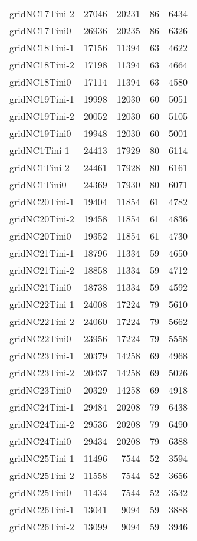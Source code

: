 \begin{tabular}{lrrrr}
gridNC17Tini-2 & 27046 & 20231 & 86 & 6434 \\
gridNC17Tini0 & 26936 & 20235 & 86 & 6326 \\
gridNC18Tini-1 & 17156 & 11394 & 63 & 4622 \\
gridNC18Tini-2 & 17198 & 11394 & 63 & 4664 \\
gridNC18Tini0 & 17114 & 11394 & 63 & 4580 \\
gridNC19Tini-1 & 19998 & 12030 & 60 & 5051 \\
gridNC19Tini-2 & 20052 & 12030 & 60 & 5105 \\
gridNC19Tini0 & 19948 & 12030 & 60 & 5001 \\
gridNC1Tini-1 & 24413 & 17929 & 80 & 6114 \\
gridNC1Tini-2 & 24461 & 17928 & 80 & 6161 \\
gridNC1Tini0 & 24369 & 17930 & 80 & 6071 \\
gridNC20Tini-1 & 19404 & 11854 & 61 & 4782 \\
gridNC20Tini-2 & 19458 & 11854 & 61 & 4836 \\
gridNC20Tini0 & 19352 & 11854 & 61 & 4730 \\
gridNC21Tini-1 & 18796 & 11334 & 59 & 4650 \\
gridNC21Tini-2 & 18858 & 11334 & 59 & 4712 \\
gridNC21Tini0 & 18738 & 11334 & 59 & 4592 \\
gridNC22Tini-1 & 24008 & 17224 & 79 & 5610 \\
gridNC22Tini-2 & 24060 & 17224 & 79 & 5662 \\
gridNC22Tini0 & 23956 & 17224 & 79 & 5558 \\
gridNC23Tini-1 & 20379 & 14258 & 69 & 4968 \\
gridNC23Tini-2 & 20437 & 14258 & 69 & 5026 \\
gridNC23Tini0 & 20329 & 14258 & 69 & 4918 \\
gridNC24Tini-1 & 29484 & 20208 & 79 & 6438 \\
gridNC24Tini-2 & 29536 & 20208 & 79 & 6490 \\
gridNC24Tini0 & 29434 & 20208 & 79 & 6388 \\
gridNC25Tini-1 & 11496 & 7544 & 52 & 3594 \\
gridNC25Tini-2 & 11558 & 7544 & 52 & 3656 \\
gridNC25Tini0 & 11434 & 7544 & 52 & 3532 \\
gridNC26Tini-1 & 13041 & 9094 & 59 & 3888 \\
gridNC26Tini-2 & 13099 & 9094 & 59 & 3946 \\

\end{tabular}
